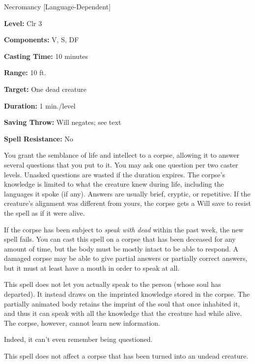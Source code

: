 
Necromancy [Language-Dependent]

\textbf{Level:} Clr 3

\textbf{Components:} V, S, DF

\textbf{Casting Time:} 10 minutes

\textbf{Range:} 10 ft.

\textbf{Target:} One dead creature

\textbf{Duration:} 1 min./level

\textbf{Saving Throw:} Will negates; see text

\textbf{Spell Resistance:} No

You grant the semblance of life and intellect to a corpse, allowing it to answer 
several questions that you put to it. You may ask one question per two caster levels. 
Unasked questions are wasted if the duration expires. The corpse's knowledge is 
limited to what the creature knew during life, including the languages it spoke 
(if any). Answers are usually brief, cryptic, or repetitive. If the creature's 
alignment was different from yours, the corpse gets a Will save to resist the spell 
as if it were alive.

If the corpse has been subject to \textit{speak with dead} within the past week, 
the new spell fails. You can cast this spell on a corpse that has been deceased 
for any amount of time, but the body must be mostly intact to be able to respond. 
A damaged corpse may be able to give partial answers or partially correct answers, 
but it must at least have a mouth in order to speak at all. 

This spell does not let you actually speak to the person (whose soul has departed). 
It instead draws on the imprinted knowledge stored in the corpse. The partially 
animated body retains the imprint of the soul that once inhabited it, and thus 
it can speak with all the knowledge that the creature had while alive. The corpse, 
however, cannot learn new information.

Indeed, it can't even remember being questioned.

This spell does not affect a corpse that has been turned into an undead creature.

